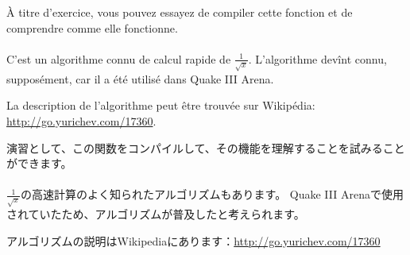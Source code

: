 \ifdefined\FRENCH
À titre d'exercice, vous pouvez essayez de compiler cette fonction et de comprendre
comme elle fonctionne.\\
\\
C'est un algorithme connu de calcul rapide de $\frac{1}{\sqrt{x}}$.
L'algorithme devînt connu, supposément, car il a été utilisé dans Quake III Arena.

La description de l'algorithme peut être trouvée sur Wikipédia: \url{http://go.yurichev.com/17360}.
\fi %

\ifdefined\JAPANESE
演習として、この関数をコンパイルして、その機能を理解することを試みることができます。\\
\\
$\frac{1}{\sqrt{x}}$の高速計算のよく知られたアルゴリズムもあります。
Quake III Arenaで使用されていたため、アルゴリズムが普及したと考えられます。

アルゴリズムの説明はWikipediaにあります：\url{http://go.yurichev.com/17360}
\fi %
